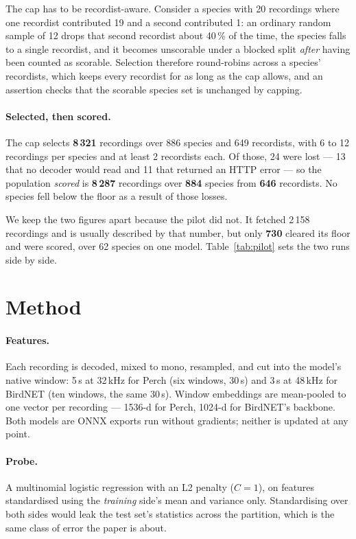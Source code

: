 \documentclass[10pt,twocolumn,a4paper]{article}
\begin{document}
The cap has to be recordist-aware. Consider a species with 20 recordings where one recordist
contributed 19 and a second contributed 1: an ordinary random sample of 12 drops that second
recordist about 40\,\% of the time, the species falls to a single recordist, and it becomes
unscorable under a blocked split \emph{after} having been counted as scorable. Selection
therefore round-robins across a species' recordists, which keeps every recordist for as long
as the cap allows, and an assertion checks that the scorable species set is unchanged by
capping.

\paragraph{Selected, then scored.} The cap selects \textbf{8\,321} recordings over 886 species
and 649 recordists, with 6 to 12 recordings per species and at least 2 recordists each. Of those,
24 were lost --- 13 that no decoder would read and 11 that returned an HTTP error --- so the
population \emph{scored} is \textbf{8\,287} recordings over \textbf{884} species from
\textbf{646} recordists. No species fell below the floor as a result of those losses.

We keep the two figures apart because the pilot did not. It fetched 2\,158 recordings and is
usually described by that number, but only \textbf{730} cleared its floor and were scored, over
62 species on one model. Table~\ref{tab:pilot} sets the two runs side by side.

\section{Method}
\label{sec:method}

\paragraph{Features.} Each recording is decoded, mixed to mono, resampled, and cut into the
model's native window: 5\,s at 32\,kHz for Perch (six windows, 30\,s) and 3\,s at 48\,kHz
for BirdNET (ten windows, the same 30\,s). Window embeddings are mean-pooled to one vector
per recording --- 1536-d for Perch, 1024-d for BirdNET's backbone. Both models are ONNX
exports run without gradients; neither is updated at any point.

\paragraph{Probe.} A multinomial logistic regression with an L2 penalty
($C = 1$), on features standardised using the \emph{training} side's mean and variance only.
Standardising over both sides would leak the test set's statistics across the partition,
which is the same class of error the paper is about.
\end{document}

